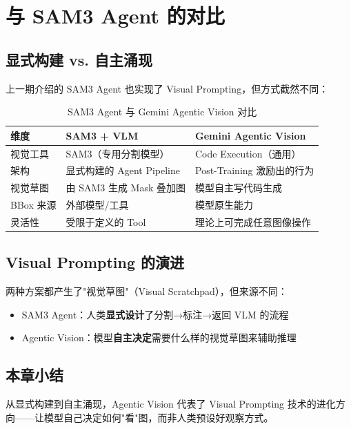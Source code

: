 \section{与 SAM3 Agent 的对比}

\subsection{显式构建 vs. 自主涌现}

上一期介绍的 SAM3 Agent 也实现了 Visual Prompting，但方式截然不同：

\begin{table}[H]
\centering
\begin{tabular}{p{3cm}p{5cm}p{5cm}}
\toprule
\textbf{维度} & \textbf{SAM3 + VLM} & \textbf{Gemini Agentic Vision} \\
\midrule
视觉工具 & SAM3（专用分割模型） & Code Execution（通用） \\
架构 & 显式构建的 Agent Pipeline & Post-Training 激励出的行为 \\
视觉草图 & 由 SAM3 生成 Mask 叠加图 & 模型自主写代码生成 \\
BBox 来源 & 外部模型/工具 & 模型原生能力 \\
灵活性 & 受限于定义的 Tool & 理论上可完成任意图像操作 \\
\bottomrule
\end{tabular}
\caption{SAM3 Agent 与 Gemini Agentic Vision 对比}
\end{table}

\subsection{Visual Prompting 的演进}

两种方案都产生了"视觉草图"（Visual Scratchpad），但来源不同：

\begin{itemize}
    \item SAM3 Agent：人类\textbf{显式设计}了分割→标注→返回 VLM 的流程
    \item Agentic Vision：模型\textbf{自主决定}需要什么样的视觉草图来辅助推理
\end{itemize}

\subsection{本章小结}

从显式构建到自主涌现，Agentic Vision 代表了 Visual Prompting 技术的进化方向——让模型自己决定如何"看"图，而非人类预设好观察方式。


